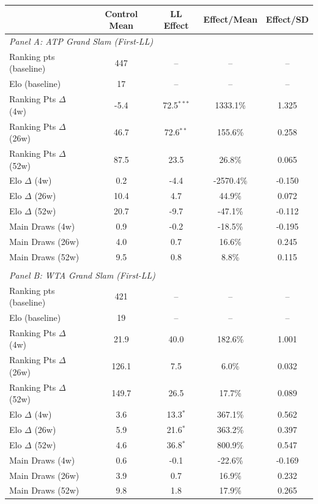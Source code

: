 \begin{tabular}{lcccc}
\toprule
 & Control Mean & LL Effect & Effect/Mean & Effect/SD \\
\midrule
\multicolumn{5}{l}{\textit{Panel A: ATP Grand Slam (First-LL)}} \\
\midrule
Ranking pts (baseline) & 447 & -- & -- & -- \\
Elo (baseline) & 17 & -- & -- & -- \\[0.3em]
\quad Ranking Pts $\Delta$ (4w) & -5.4 & 72.5$^{***}$ & 1333.1\% & 1.325 \\
\quad Ranking Pts $\Delta$ (26w) & 46.7 & 72.6$^{**}$ & 155.6\% & 0.258 \\
\quad Ranking Pts $\Delta$ (52w) & 87.5 & 23.5 & 26.8\% & 0.065 \\

\quad Elo $\Delta$ (4w) & 0.2 & -4.4 & -2570.4\% & -0.150 \\
\quad Elo $\Delta$ (26w) & 10.4 & 4.7 & 44.9\% & 0.072 \\
\quad Elo $\Delta$ (52w) & 20.7 & -9.7 & -47.1\% & -0.112 \\

\quad Main Draws (4w) & 0.9 & -0.2 & -18.5\% & -0.195 \\
\quad Main Draws (26w) & 4.0 & 0.7 & 16.6\% & 0.245 \\
\quad Main Draws (52w) & 9.5 & 0.8 & 8.8\% & 0.115 \\

\\[0.5em]
\multicolumn{5}{l}{\textit{Panel B: WTA Grand Slam (First-LL)}} \\
\midrule
Ranking pts (baseline) & 421 & -- & -- & -- \\
Elo (baseline) & 19 & -- & -- & -- \\[0.3em]
\quad Ranking Pts $\Delta$ (4w) & 21.9 & 40.0 & 182.6\% & 1.001 \\
\quad Ranking Pts $\Delta$ (26w) & 126.1 & 7.5 & 6.0\% & 0.032 \\
\quad Ranking Pts $\Delta$ (52w) & 149.7 & 26.5 & 17.7\% & 0.089 \\

\quad Elo $\Delta$ (4w) & 3.6 & 13.3$^{*}$ & 367.1\% & 0.562 \\
\quad Elo $\Delta$ (26w) & 5.9 & 21.6$^{*}$ & 363.2\% & 0.397 \\
\quad Elo $\Delta$ (52w) & 4.6 & 36.8$^{*}$ & 800.9\% & 0.547 \\

\quad Main Draws (4w) & 0.6 & -0.1 & -22.6\% & -0.169 \\
\quad Main Draws (26w) & 3.9 & 0.7 & 16.9\% & 0.232 \\
\quad Main Draws (52w) & 9.8 & 1.8 & 17.9\% & 0.265 \\


\end{tabular}
